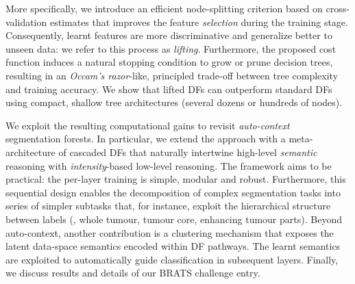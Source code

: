 More specifically, we introduce an efficient node-splitting criterion based on 
cross-validation estimates that improves the feature \textit{selection} during the training stage. Consequently, 
learnt features are more discriminative and generalize better to unseen data: we refer to this process as 
\textit{lifting}. Furthermore, the proposed cost function induces a natural stopping condition to grow or prune decision trees, %
resulting in an \textit{Occam's razor}-like, principled trade-off between tree complexity and training accuracy. %
We show that lifted DFs can outperform standard DFs using compact, shallow tree architectures 
(several dozens or hundreds of nodes). 

We exploit the resulting computational gains to revisit \textit{auto-context}~\cite{tu2008auto,tu2010auto,shotton2008semantic} segmentation forests. 
In particular, we extend the approach with a meta-architecture of cascaded DFs that naturally 
intertwine high-level \textit{semantic} reasoning with \textit{intensity}-based low-level reasoning. The framework aims to be practical: the per-layer training is simple, modular and robust. Furthermore, this sequential design enables the 
decomposition of complex segmentation tasks into series of simpler subtasks that, for instance, exploit the hierarchical structure between labels (\eg, whole tumour, tumour core, enhancing tumour parts). Beyond auto-context, another
contribution is a clustering mechanism that exposes the latent data-space semantics encoded within DF pathways. The 
learnt semantics are exploited to automatically guide classification in subsequent layers.
Finally, we discuss results and details of our BRATS challenge entry.



